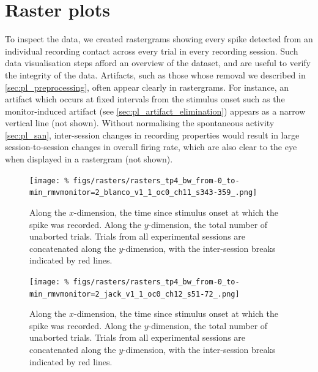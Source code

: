 \FloatBarrier
\section{Raster plots}
\label{sec:pl_rasters}

To inspect the data, we created rastergrams showing every spike detected from an individual recording contact across every trial in every recording session.
Such data visualisation steps afford an overview of the dataset, and are useful to verify the integrity of the data.
Artifacts, such as those whose removal we described in \autoref{sec:pl_preprocessing}, often appear clearly in rastergrams.
For instance, an artifact which occurs at fixed intervals from the stimulus onset such as the monitor-induced artifact (see \autoref{sec:pl_artifact_elimination}) appears as a narrow vertical line (not shown).
Without normalising the spontaneous activity \autoref{sec:pl_san}, inter-session changes in recording properties would result in large session-to-session changes in overall firing rate, which are also clear to the eye when displayed in a rastergram (not shown).


\begin{figure}[p]
    \centering
    \texttt{[image: \%
figs/rasters/rasters\_tp4\_bw\_from-0\_to-min\_rmvmonitor=2\_blanco\_v1\_1\_oc0\_ch11\_s343-359\_.png]}
    \caption{
    Along the $x$-dimension, the time since stimulus onset at which the spike was recorded.
    Along the $y$-dimension, the total number of unaborted trials.
    Trials from all experimental sessions are concatenated along the $y$-dimension, with the inter-session breaks indicated by red lines.
}
    \label{fig:raster_blanco_v1}
\end{figure}


\begin{figure}[p]
    \centering
    \texttt{[image: \%
figs/rasters/rasters\_tp4\_bw\_from-0\_to-min\_rmvmonitor=2\_jack\_v1\_1\_oc0\_ch12\_s51-72\_.png]}
    \caption{
    Along the $x$-dimension, the time since stimulus onset at which the spike was recorded.
    Along the $y$-dimension, the total number of unaborted trials.
    Trials from all experimental sessions are concatenated along the $y$-dimension, with the inter-session breaks indicated by red lines.
}
    \label{fig:raster_jack_v1}
\end{figure}



